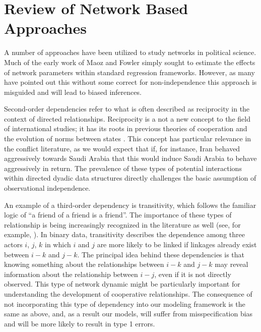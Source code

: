 \section{Review of Network Based Approaches}

A number of approaches have been utilized to study networks in political science. Much of the early work of Maoz and Fowler simply sought to estimate the effects of network parameters within standard regression frameworks. However, as many have pointed out this without some correct for non-independence this approach is misguided and will lead to biased inferences. 

Second-order dependencies refer to what is often described as reciprocity in the context of directed relationships. Reciprocity is a not a new concept to the field of international studies; it has its roots in previous theories of cooperation and the evolution of norms between states \citep{richardson:1960,choucri:north:1972}. This concept has particular relevance in the conflict literature, as we would expect that if, for instance, Iran behaved aggressively towards Saudi Arabia that this would induce Saudi Arabia to behave aggressively in return. The prevalence of these types of potential interactions within directed dyadic data structures directly challenges the basic assumption of observational independence.

An example of a third-order dependency is transitivity, which follows the familiar logic of ``a friend of a friend is a friend''. The importance of these types of relationship is being increasingly recognized in the literature as well (see, for example, \citealp{lai:1995,manger:etal:2012,kinne:2013}). In binary data, transitivity describes the dependence among three actors $i$, $j$, $k$ in which $i$ and $j$ are more likely to be linked if linkages already exist between $i - k$ and $j - k$. The principal idea behind these dependencies is that knowing something about the relationships between $i-k$ and $j-k$ may reveal information about the relationship between $i-j$, even if it is not directly observed. This type of network dynamic might be particularly important for understanding the development of cooperative relationships. The consequence of not incorporating this type of dependency into our modeling framework is the same as above, and, as a result our models, will suffer from misspecification bias and will be more likely to result in type 1 errors. 

